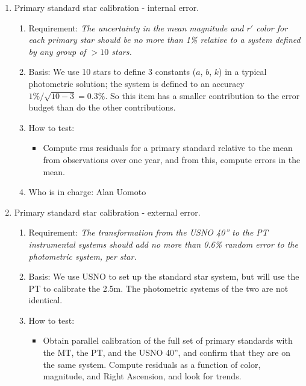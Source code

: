 \begin{enumerate}
\item Primary standard star calibration - internal error.

   \begin{enumerate}
   \item Requirement: {\it The uncertainty in the mean magnitude and
$r'$ color for each primary star should be no more than 1\%
	relative to a system defined by any group of ${}> 10$ stars.}
   \item Basis: We use 10 stars to define 3 constants ($a$, $b$, $k$)
	in a typical photometric solution; the system is defined to
	an accuracy $1\%/\sqrt{10-3} = 0.3\%$.  So this item has a
	smaller contribution to the error budget than do the other
	contributions. 
   \item How to test:
	\begin{itemize}
	\item Compute rms residuals for a primary standard relative
	   to the mean from observations over one year, and from this,
	   compute errors in the mean.
	\end{itemize}

   \item Who is in charge: Alan Uomoto
   \end{enumerate}

\item Primary standard star calibration - external error.

   \begin{enumerate}
   \item Requirement: {\it The transformation from the USNO 40'' to
the PT instrumental systems should add no more than 0.6\% random error
to the photometric system, per star.}
   \item Basis: We use USNO to set up the standard star system, but will
	use the PT to calibrate the 2.5m.  The photometric systems of
	the two are not identical. 
   \item How to test:
	\begin{itemize}
	\item Obtain parallel calibration of the full set of primary standards
	   with the MT, the PT, and the USNO 40'', and confirm that they are on the
	   same system.  Compute residuals as a function of color, magnitude, and
	   Right Ascension, and look for trends.  
	\end{itemize}


\end{enumerate}
\end{enumerate}
